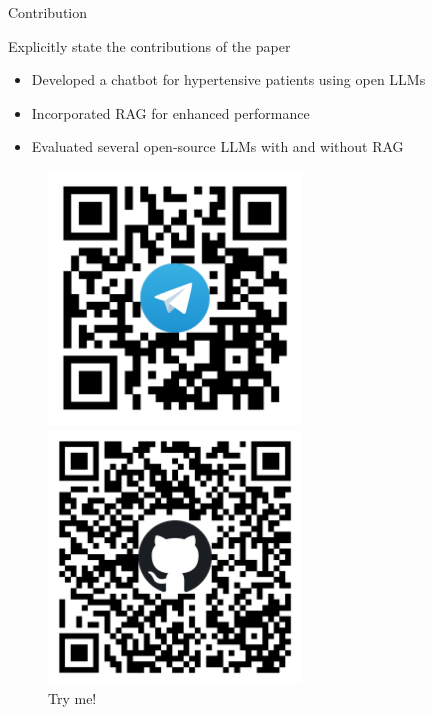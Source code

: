 \documentclass[handout]{beamer}\mode<handout>{\usetheme{AMSBolognaFC}}
\begin{document}
\begin{frame}{Contribution}

    \begin{block}{Explicitly state the contributions of the paper}
        \begin{itemize}
            \item Developed a chatbot for hypertensive patients using \alert{open LLMs}
            \item Incorporated \alert{RAG} for enhanced performance
            \item \alert{Evaluated} several open-source LLMs with and without RAG
        \end{itemize}
    \end{block}
    \vfill
    \begin{figure}
        \begin{minipage}{0.3\textwidth}
            \centering
            \includegraphics[width=0.6\textwidth]{figures/telegram-bot}
            \caption{Try me!}
        \end{minipage}
        \hspace{0.2cm}
        \begin{minipage}{0.3\textwidth}
            \centering
            \includegraphics[width=0.6\textwidth]{figures/github-repo}

\end{minipage}
\end{figure}
\end{frame}
\end{document}

